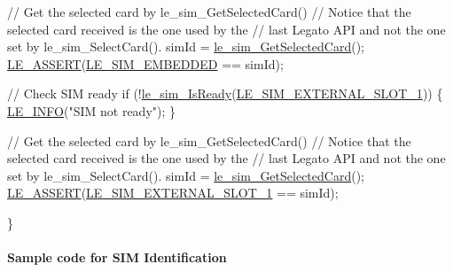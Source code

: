 \begin{DoxyCodeInclude}
    \textcolor{comment}{// Get the selected card by le\_sim\_GetSelectedCard()}
    \textcolor{comment}{// Notice that the selected card received is the one used by the}
    \textcolor{comment}{// last Legato API and not the one set by le\_sim\_SelectCard().}
    simId = \hyperlink{le__sim__interface_8h_a4c9e3ded0485f14c66e4d51763f2de57}{le\_sim\_GetSelectedCard}();
    \hyperlink{le__log_8h_ac0dbbef91dc0fed449d0092ff0557b39}{LE\_ASSERT}(\hyperlink{le__sim__interface_8h_aace49df88426119626fb1ef4e544ccddac9d9805213bfb9ae4d299aa70097846a}{LE\_SIM\_EMBEDDED} == simId);

    \textcolor{comment}{// Check SIM ready}
    \textcolor{keywordflow}{if} (!\hyperlink{le__sim__interface_8h_ace457890856d3692ecb4176f0e892558}{le\_sim\_IsReady}(\hyperlink{le__sim__interface_8h_aace49df88426119626fb1ef4e544ccdda4270fb44e8fa7876f337864675b42f2d}{LE\_SIM\_EXTERNAL\_SLOT\_1}))
    \{
        \hyperlink{le__log_8h_a23e6d206faa64f612045d688cdde5808}{LE\_INFO}(\textcolor{stringliteral}{"SIM not ready"});
    \}

    \textcolor{comment}{// Get the selected card by le\_sim\_GetSelectedCard()}
    \textcolor{comment}{// Notice that the selected card received is the one used by the}
    \textcolor{comment}{// last Legato API and not the one set by le\_sim\_SelectCard().}
    simId = \hyperlink{le__sim__interface_8h_a4c9e3ded0485f14c66e4d51763f2de57}{le\_sim\_GetSelectedCard}();
    \hyperlink{le__log_8h_ac0dbbef91dc0fed449d0092ff0557b39}{LE\_ASSERT}(\hyperlink{le__sim__interface_8h_aace49df88426119626fb1ef4e544ccdda4270fb44e8fa7876f337864675b42f2d}{LE\_SIM\_EXTERNAL\_SLOT\_1} == simId);


\}
\end{DoxyCodeInclude}
\hypertarget{c_simTestIdentification}{}\paragraph{Sample code for S\+IM Identification}\label{c_simTestIdentification}

\begin{DoxyCodeInclude}
\end{DoxyCodeInclude}

